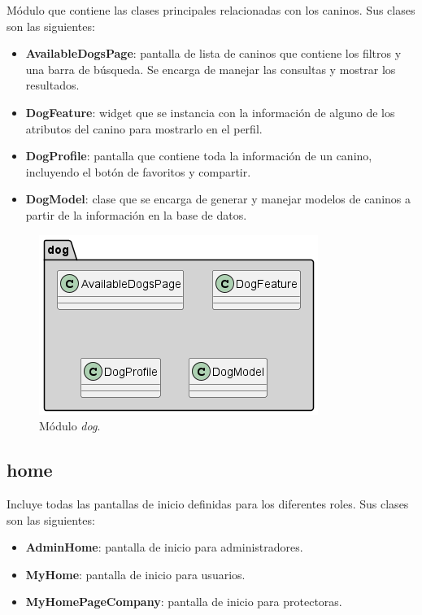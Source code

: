 \documentclass[a4paper, 12pt]{article}
\begin{document}
Módulo que contiene las clases principales relacionadas con los caninos. Sus clases son las siguientes:

\begin{itemize}[noitemsep]
	\item \textbf{AvailableDogsPage}: pantalla de lista de caninos que contiene los filtros y una barra de búsqueda. Se encarga de manejar las consultas y mostrar los resultados.
	\item \textbf{DogFeature}: widget que se instancia con la información de alguno de los atributos del canino para mostrarlo en el perfil.
	\item \textbf{DogProfile}: pantalla que contiene toda la información de un canino, incluyendo el botón de favoritos y compartir.
	\item \textbf{DogModel}: clase que se encarga de generar y manejar modelos de caninos a partir de la información en la base de datos.
\end{itemize}

\begin{figure}[H]
	\begin{center}
		{\includegraphics[width=0.8\linewidth]{diagram/Dog.png}\par}
		\caption{Módulo  \textit{dog}.}
	\end{center}
\end{figure}


\subsection*{home}

Incluye todas las pantallas de inicio definidas para los diferentes roles. Sus clases son las siguientes:

\begin{itemize}[noitemsep]
	\item \textbf{AdminHome}: pantalla de inicio para administradores.
	\item \textbf{MyHome}: pantalla de inicio para usuarios.
	\item \textbf{MyHomePageCompany}: pantalla de inicio para protectoras.
\end{itemize}
\end{document}

